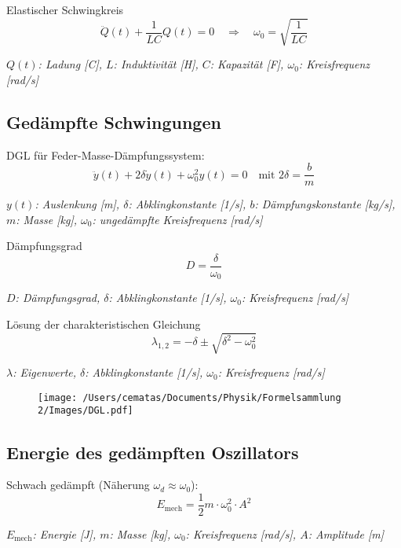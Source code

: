 \documentclass[a4paper,10pt]{article}
\newenvironment{displayformula}
{
	\begin{framed}
		\color{formulaColor}
	}
	{\end{framed}}
\newcommand{\formulalegend}[1]{%
	\par\vspace{0.5ex}%
	{{\color{legendColor}\RaggedRight\small\textit{#1}}}%
	\par\vspace{1.5ex}%
}
\begin{document}
\begin{displayformula}
	Elastischer Schwingkreis
	\[
	\ddot{Q}(t) + \frac{1}{LC} Q(t) = 0
	\quad \Rightarrow \quad \omega_0 = \sqrt{\frac{1}{LC}}
	\]
\end{displayformula}
\formulalegend{
	\( Q(t) \): Ladung [C], \( L \): Induktivität [H], \( C \): Kapazität [F], \( \omega_0 \): Kreisfrequenz [rad/s]
}


\subsection{Gedämpfte Schwingungen}

\begin{displayformula}
	DGL für Feder-Masse-Dämpfungssystem:
	\[
	\ddot{y}(t) + 2\delta \dot{y}(t) + \omega_0^2 y(t) = 0
	\quad \text{mit } 2\delta = \frac{b}{m}
	\]
\end{displayformula}
\formulalegend{
	\( y(t) \): Auslenkung [m], \( \delta \): Abklingkonstante [1/s], \( b \): Dämpfungskonstante [kg/s], \( m \): Masse [kg], \( \omega_0 \): ungedämpfte Kreisfrequenz [rad/s]
}

\begin{displayformula}
	Dämpfungsgrad
	\[
	D = \frac{\delta}{\omega_0}
	\]
\end{displayformula}
\formulalegend{
	\( D \): Dämpfungsgrad, \( \delta \): Abklingkonstante [1/s], \( \omega_0 \): Kreisfrequenz [rad/s]
}

\begin{displayformula}
	Lösung der charakteristischen Gleichung
	\[
	\lambda_{1,2} = -\delta \pm \sqrt{\delta^2 - \omega_0^2}
	\]
\end{displayformula}
\formulalegend{
	\( \lambda \): Eigenwerte, \( \delta \): Abklingkonstante [1/s], \( \omega_0 \): Kreisfrequenz [rad/s]
}

\begin{figure}[h!]
	\centering
	\texttt{[image: /Users/cematas/Documents/Physik/Formelsammlung 2/Images/DGL.pdf]}
\end{figure}

\subsection{Energie des gedämpften Oszillators}

\begin{displayformula}
	Schwach gedämpft (Näherung \( \omega_d \approx \omega_0 \)):
	\[
	E_{\text{mech}} = \frac{1}{2} m \cdot \omega_0^2 \cdot A^2
	\]
\end{displayformula}
\formulalegend{
	\( E_{\text{mech}} \): Energie [J], \( m \): Masse [kg], \( \omega_0 \): Kreisfrequenz [rad/s], \( A \): Amplitude [m]
}
\end{document}
